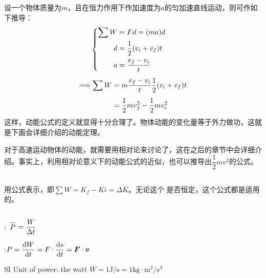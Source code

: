 设一个物体质量为$m$，且在恒力作用下作加速度为$a$的匀加速直线运动，则可作如下推导：
\begin{equation}
    \begin{aligned}
                               & \hspace*{-3em}\left\{\begin{aligned}
                                                          \sum W & =Fd=(ma)d                  \\
                                                          d      & =\frac{1}{2}(v_{i}+v_{f})t \\
                                                          a      & =\frac{v_{f}-v_{i}}{t}
                                                      \end{aligned}\right. \\[1ex]
        \Longrightarrow \sum W & =m\frac{v_{f}-v_{i}}{t}\frac{1}{2}(v_{i}+v_{f})t         \\[1ex]
                               & =\frac{1}{2}mv_{f}^{2}-\frac{1}{2}mv_{i}^{2}
    \end{aligned}
    \nonumber
\end{equation}
这样，动能公式的定义就显得十分合理了。物体动能的变化量等于外力做功，这就是下面会详细介绍的动能定理。

对于高速运动物体的动能，就需要用相对论来讨论了，这在之后的章节中会详细介绍。事实上，利用相对论意义下的动能公式的近似，也可以推导出$\dfrac{1}{2}mv^{2}$的公式。
\subsection[动能定理]{}
\begin{law}
\end{law}
用公式表示，即$\sum W =K_{f}-K{i}=\Delta K$。无论这个  是否恒定，这个公式都是适用的。
\subsection[功率]{}
\begin{Itemize}
    \item {}
    \item {}: $\upperline{P} =\dfrac{W}{\Delta t}$
    \item {}:$P=\dfrac{\dif W}{\dif t}=F\cdot\dfrac{\dif s}{\dif t}=\vec{F}\cdot\vec{v}$
    \item SI Unit of power: the watt $W=1\mathrm{J}/\mathrm{s}=1\mathrm{kg}\cdot \mathrm{m}^2/\mathrm{s}^3$
\end{Itemize}

